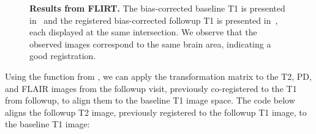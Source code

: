 \documentclass[a4paper]{report}\usepackage[]{graphicx}\usepackage[]{color}
\makeatletter
\let\pkg=\strong
\DeclareRobustCommand\code{\bgroup\@noligs\@codex}
\makeatother
\begin{document}
\begin{article}
\begin{figure}
\hfill
\caption{{\bf Results from FLIRT.} The bias-corrected baseline T1 is presented in~\protect{} and the registered bias-corrected followup T1 is presented in~\protect{}, each displayed at the same intersection. We observe that the observed images correspond to the same brain area, indicating a good registration. }
\label{fig:flirt}
\end{figure}


Using the \code{flirt\_apply} function from \pkg{fslr}, we can apply the transformation matrix to the T2, PD, and FLAIR images from the followup visit, previously co-registered to the T1 from followup, to align them to the baseline T1 image space.  The code below aligns the followup T2 image, previously registered to the followup T1 image, to the baseline T1 image:



\end{article}
\end{document}
